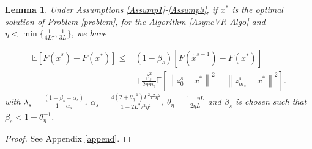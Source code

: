 \documentclass{article}
\newcommand*{\E}{\mathbb{E}}
\newcommand{\norm}[1]{\left\lVert#1\right\rVert}
\newtheorem{lemma}[theorem]{Lemma}
\theoremstyle{definition}
\theoremstyle{remark}
\begin{document}
\begin{lemma}\label{lemma1}
Under Assumptions \ref{Assump1}-\ref{Assump3}, if $x^*$ is the optimal solution of Problem \eqref{problem}, for the Algorithm \ref{AsyncVR-Algo} and $\eta < \min\{\frac{1}{4L
\tau}, \frac{1}{3L}\}$, we have 

\begin{equation}
\begin{split}
\E[F(\widetilde{x}^s)-F(x^*)] \leq &(1-\beta_s)[F(\widetilde{x}^{s-1})-F(x^*)] \\
&+ {\frac{ \beta_s^2}{2\eta m_s}}\E[\norm{z_{0}^s-x^*}^2-\norm{z_{m_s}^s-x^*}^2]. 
\end{split}
\end{equation}
with $\lambda_s = \frac{(1-\beta_s+\alpha_s)}{1-\alpha_s}$, $\alpha_s=\frac{4(2+\theta_{\eta}^{-1})L^2\tau^2\eta^2}{1-2L^2 \tau^2\eta^2}$, $\theta_{\eta} = \frac{1-\eta L}{2\eta L}$ and $\beta_s$ is chosen such that $\beta_s < 1-\theta_{\eta}^{-1}$.
\end{lemma}
\begin{proof}
See Appendix \ref{append}.
\end{proof}
\end{document}
